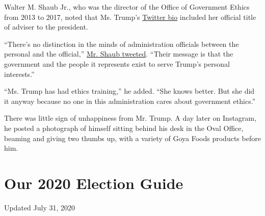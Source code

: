 Walter M. Shaub Jr., who was the director of the Office of Government
Ethics from 2013 to 2017, noted that Ms. Trump's
\href{https://twitter.com/IvankaTrump}{Twitter bio} included her
official title of adviser to the president.

``There's no distinction in the minds of administration officials
between the personal and the official,''
\href{https://twitter.com/waltshaub/status/1283379197646381064?s=20}{Mr.
Shaub tweeted}. ``Their message is that the government and the people it
represents exist to serve Trump's personal interests.''

``Ms. Trump has had ethics training,'' he added. ``She knows better. But
she did it anyway because no one in this administration cares about
government ethics.''

There was little sign of unhappiness from Mr. Trump. A day later on
Instagram, he posted a photograph of himself sitting behind his desk in
the Oval Office, beaming and giving two thumbs up, with a variety of
Goya Foods products before him.

\hypertarget{our-2020-election-guide}{%
\section{Our 2020 Election Guide}\label{our-2020-election-guide}}

Updated July 31, 2020

